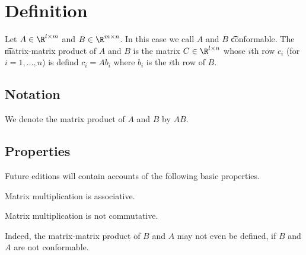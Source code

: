 

\section*{Definition}

Let $A \in \R ^{l \times  m}$ and $B \in \R ^{m \times  n}$.
In this case we call $A$ and $B$ \t{conformable}.
The \t{matrix-matrix product} of $A$ and $B$ is the matrix $C \in \R ^{l \times  n}$ whose $i$th row $c_i$ (for $i = 1, \dots , n$) is defind $c_i = Ab_i$ where $b_i$ is the $i$th row of $B$.

\subsection*{Notation}

We denote the matrix product of $A$ and $B$ by $AB$.

\subsection*{Properties}

Future editions will contain accounts of the following basic properties.

\begin{proposition}
Matrix multiplication is associative.\end{proposition}
\begin{proposition}
Matrix multiplication is not commutative.\end{proposition}
Indeed, the matrix-matrix product of $B$ and $A$ may not even be defined, if $B$ and $A$ are not conformable.

\blankpage